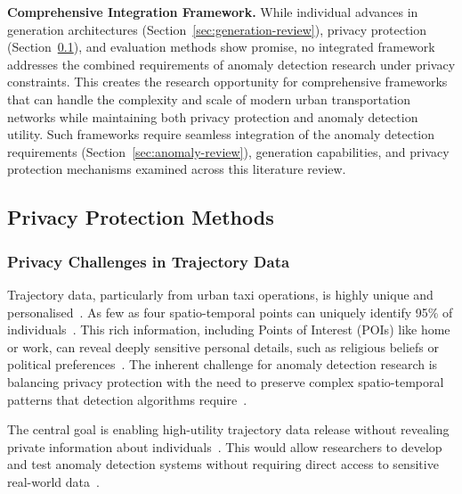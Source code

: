 \textbf{Comprehensive Integration Framework.} While individual advances in generation architectures (Section~\ref{sec:generation-review}), privacy protection (Section~\ref{sec:privacy-review}), and evaluation methods show promise, no integrated framework addresses the combined requirements of anomaly detection research under privacy constraints. This creates the research opportunity for comprehensive frameworks that can handle the complexity and scale of modern urban transportation networks while maintaining both privacy protection and anomaly detection utility. Such frameworks require seamless integration of the anomaly detection requirements (Section~\ref{sec:anomaly-review}), generation capabilities, and privacy protection mechanisms examined across this literature review.

\subsection{Privacy Protection Methods}
\label{sec:privacy-review}

\subsubsection{Privacy Challenges in Trajectory Data}

Trajectory data, particularly from urban taxi operations, is highly unique and personalised~\cite{primaultLongRoadComputational2019,buchholzReconstructionAttackDifferential2022,maTrajectoryPrivacyProtection2021}. As few as four spatio-temporal points can uniquely identify 95\% of individuals~\cite{primaultLongRoadComputational2019,buchholzReconstructionAttackDifferential2022,maTrajectoryPrivacyProtection2021}. This rich information, including Points of Interest (POIs) like home or work, can reveal deeply sensitive personal details, such as religious beliefs or political preferences~\cite{primaultLongRoadComputational2019,buchholzReconstructionAttackDifferential2022}. The inherent challenge for anomaly detection research is balancing privacy protection with the need to preserve complex spatio-temporal patterns that detection algorithms require~\cite{buchholzSystematisationKnowledgeTrajectory2024,buchholzReconstructionAttackDifferential2022,primaultLongRoadComputational2019,naghizadePrivacyContextawareRelease2020}.

The central goal is enabling high-utility trajectory data release without revealing private information about individuals~\cite{buchholzSystematisationKnowledgeTrajectory2024,raoLSTMTrajGANDeepLearning2020,liuTrajGANsUsingGenerative2018,jinSurveyExperimentalStudy2023,maTrajectoryPrivacyProtection2021,naghizadePrivacyContextawareRelease2020}. This would allow researchers to develop and test anomaly detection systems without requiring direct access to sensitive real-world data~\cite{buchholzSystematisationKnowledgeTrajectory2024,raoLSTMTrajGANDeepLearning2020,liuTrajGANsUsingGenerative2018}.

